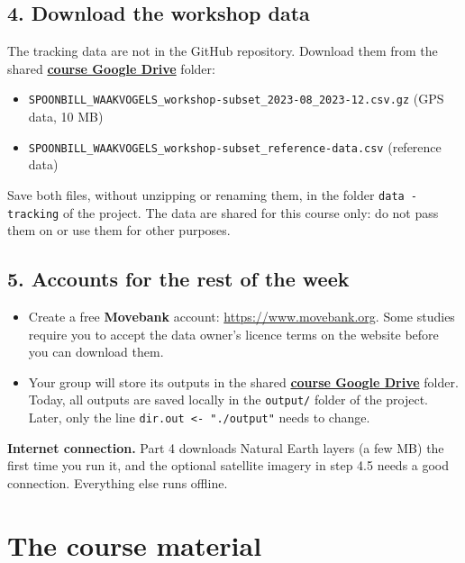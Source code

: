 \documentclass[11pt,a4paper]{article}
\begin{document}
\subsection{4. Download the workshop data}
The tracking data are not in the GitHub repository. Download them from the shared \href{https://drive.google.com/drive/folders/1ijXcZ5Htpthri6gpWZAaoprk31PzBblI}{\textbf{course Google Drive}} folder:
\begin{itemize}[leftmargin=*]
\item \texttt{SPOONBILL\_WAAKVOGELS\_workshop-subset\_2023-08\_2023-12.csv.gz} (GPS data, 10 MB)
\item \texttt{SPOONBILL\_WAAKVOGELS\_workshop-subset\_reference-data.csv} (reference data)
\end{itemize}
Save both files, without unzipping or renaming them, in the folder \texttt{data - tracking} of the project. The data are shared for this course only: do not pass them on or use them for other purposes.

\subsection{5. Accounts for the rest of the week}
\begin{itemize}[leftmargin=*]
\item Create a free \textbf{Movebank} account: \url{https://www.movebank.org}. Some studies require you to accept the data owner's licence terms on the website before you can download them.
\item Your group will store its outputs in the shared \href{https://drive.google.com/drive/folders/1ijXcZ5Htpthri6gpWZAaoprk31PzBblI}{\textbf{course Google Drive}} folder. Today, all outputs are saved locally in the \texttt{output/} folder of the project. Later, only the line \texttt{dir.out <- "./output"} needs to change.
\end{itemize}

\begin{notebox}
\textbf{Internet connection.} Part 4 downloads Natural Earth layers (a few MB) the first time you run it, and the optional satellite imagery in step 4.5 needs a good connection. Everything else runs offline.
\end{notebox}

\section{The course material}
\end{document}
